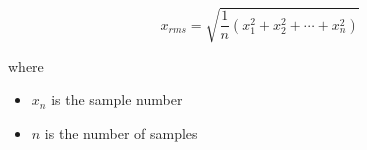 \[ x_{rms} = \sqrt{\frac{1}{n}\left(x_1^2+x_2^2+\cdots+x_n^2\right)}\]

where
\begin{itemize}
\item $x_n$ is the sample number
\item $n$ is the number of samples
\end{itemize}

\newpage











